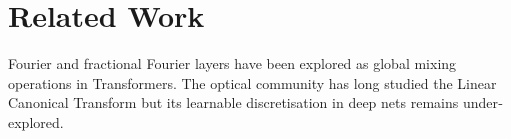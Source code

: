 \section{Related Work}
\label{sec:related_work}
Fourier and fractional Fourier layers have been explored as global mixing operations in Transformers\citep{lee2021fnet,chi2022flashfft}.  The optical community has long studied the Linear Canonical Transform\citep{pei1997,chen2009} but its learnable discretisation in deep nets remains under‐explored.